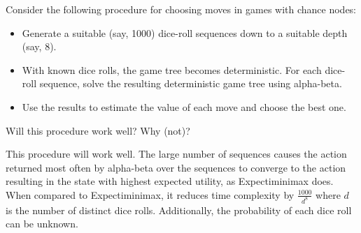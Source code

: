 \documentclass[12pt]{article}
\newenvironment{problem}[2][Problem]{\begin{trivlist}
\item[\hskip \labelsep {\bfseries #1}\hskip \labelsep {\bfseries #2.}]}{\end{trivlist}}
\begin{document}
\begin{problem}{5}
	Consider the following procedure for choosing moves in games with chance nodes:
	\begin{itemize}
		\item Generate a suitable (say, 1000) dice-roll sequences down to a suitable depth (say, 8).
		\item With known dice rolls, the game tree becomes deterministic. For each dice-roll sequence, solve the resulting deterministic game tree using alpha-beta.
		\item Use the results to estimate the value of each move and choose the best one.
	\end{itemize}
	Will this procedure work well? Why (not)?

	\vspace{0.25cm}
	This procedure will work well. 
	The large number of sequences causes the action returned most often by alpha-beta over the sequences to converge to the action resulting in the state with highest expected utility, as Expectiminimax does.
	When compared to Expectiminimax, it reduces time complexity by $\frac{1000}{d^8}$ where $d$ is the number of distinct dice rolls.
	Additionally, the probability of each dice roll can be unknown.
\end{problem}
\end{document}
